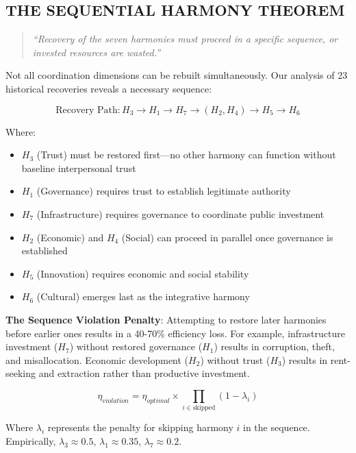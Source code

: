 \documentclass[11pt,letterpaper]{article}
\begin{document}
\subsection{THE SEQUENTIAL HARMONY THEOREM}

\begin{quote}
\textit{``Recovery of the seven harmonies must proceed in a specific sequence, or invested resources are wasted.''}
\end{quote}

Not all coordination dimensions can be rebuilt simultaneously. Our analysis of 23 historical recoveries reveals a necessary sequence:

\begin{equation}
\text{Recovery Path}: H_3 \rightarrow H_1 \rightarrow H_7 \rightarrow (H_2, H_4) \rightarrow H_5 \rightarrow H_6
\label{eq:sequence}
\end{equation}

Where:
\begin{itemize}
\item $H_3$ (Trust) must be restored first---no other harmony can function without baseline interpersonal trust
\item $H_1$ (Governance) requires trust to establish legitimate authority
\item $H_7$ (Infrastructure) requires governance to coordinate public investment
\item $H_2$ (Economic) and $H_4$ (Social) can proceed in parallel once governance is established
\item $H_5$ (Innovation) requires economic and social stability
\item $H_6$ (Cultural) emerges last as the integrative harmony
\end{itemize}

\textbf{The Sequence Violation Penalty}: Attempting to restore later harmonies before earlier ones results in a 40-70\% efficiency loss. For example, infrastructure investment ($H_7$) without restored governance ($H_1$) results in corruption, theft, and misallocation. Economic development ($H_2$) without trust ($H_3$) results in rent-seeking and extraction rather than productive investment.

\begin{equation}
\eta_{violation} = \eta_{optimal} \times \prod_{i \in \text{skipped}} (1 - \lambda_i)
\label{eq:violation_penalty}
\end{equation}

Where $\lambda_i$ represents the penalty for skipping harmony $i$ in the sequence. Empirically, $\lambda_3 \approx 0.5$, $\lambda_1 \approx 0.35$, $\lambda_7 \approx 0.2$.
\end{document}
